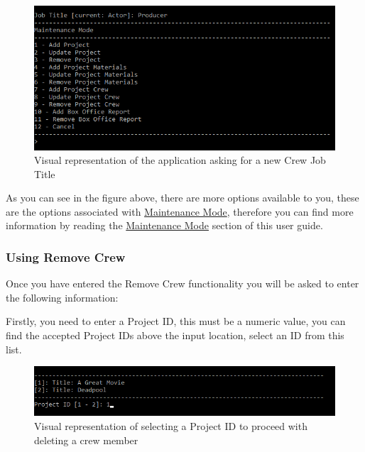 \documentclass[
  english,
  a4paper,
,tablecaptionabove
]{scrartcl}
\begin{document}
\begin{figure}
\centering
\includegraphics{images/user-guide/maintenance-mode/update-crew-job-title.png}
\caption{Visual representation of the application asking for a new Crew
Job Title}
\end{figure}

As you can see in the figure above, there are more options available to
you, these are the options associated with
\protect\hyperlink{using-maintenance-mode}{Maintenance Mode}, therefore
you can find more information by reading the
\protect\hyperlink{using-maintenance-mode}{Maintenance Mode} section of
this user guide.

\newpage

\hypertarget{using-remove-crew}{%
\subsubsection{Using Remove Crew}\label{using-remove-crew}}

Once you have entered the Remove Crew functionality you will be asked to
enter the following information:

Firstly, you need to enter a Project ID, this must be a numeric value,
you can find the accepted Project IDs above the input location, select
an ID from this list.

\begin{figure}
\centering
\includegraphics{images/user-guide/maintenance-mode/update-project-select-id.png}
\caption{Visual representation of selecting a Project ID to proceed with
deleting a crew member}
\end{figure}
\end{document}
